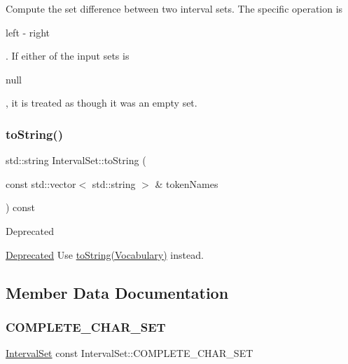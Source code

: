 Compute the set difference between two interval sets. The specific operation is
\begin{DoxyCode}
left - right 
\end{DoxyCode}
 . If either of the input sets is 
\begin{DoxyCode}
null 
\end{DoxyCode}
 , it is treated as though it was an empty set. \mbox{\label{classantlr4_1_1misc_1_1IntervalSet_aca1798065f0f309e559c6c6efc07b6b1}} 
\subsubsection{\texorpdfstring{to\+String()}{toString()}}
{\footnotesize\ttfamily std\+::string Interval\+Set\+::to\+String (\begin{DoxyParamCaption}\item[{const std\+::vector$<$ std\+::string $>$ \&}]{token\+Names }\end{DoxyParamCaption}) const}

\begin{DoxyRefDesc}{Deprecated}
\item[\hyperlink{deprecated__deprecated000008}{Deprecated}]Use \hyperlink{}{to\+String(\+Vocabulary)} instead. \end{DoxyRefDesc}


\subsection{Member Data Documentation}
\mbox{\label{classantlr4_1_1misc_1_1IntervalSet_a9ca1324ca4b7f1c69ffe44f0b3f14bca}} 
\subsubsection{\texorpdfstring{C\+O\+M\+P\+L\+E\+T\+E\+\_\+\+C\+H\+A\+R\+\_\+\+S\+ET}{COMPLETE\_CHAR\_SET}}
{\footnotesize\ttfamily \hyperlink{classantlr4_1_1misc_1_1IntervalSet}{Interval\+Set} const Interval\+Set\+::\+C\+O\+M\+P\+L\+E\+T\+E\+\_\+\+C\+H\+A\+R\+\_\+\+S\+ET\hspace{0.3cm}{\ttfamily [static]}}

